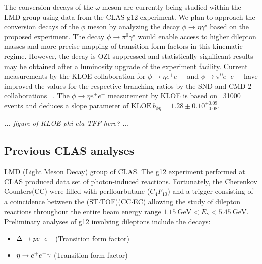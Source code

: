 The conversion decays of the  $\omega$ meson are currently being studied within the LMD group using data from the CLAS g12 experiment. 
We plan to approach the conversion decays of the $\phi$ meson by analyzing the decay $\phi\to\eta\gamma^\star$ based on the proposed experiment. 
The decay $\phi \to \pi^0\gamma^\star$ would enable access to higher dilepton masses and more precise mapping of transition form factors in this kinematic regime. However, the decay is OZI suppressed and statistically significant results may be obtained after a luminosity upgrade of the experiment facility.
Current measurements by the KLOE collaboration for $\phi\to\eta e^+e^-$~\cite{Babusci:2014ldz} and $\phi\to\pi^0 e^+e^-$~\cite{Anastasi:2016bfh} have improved the values for the respective branching ratios by the SND and CMD-2 collaborations ~\cite{Achasov:2000ne,Akhmetshin:2000bw,Achasov:2002hs,Akhmetshin:2000wi}. The $\phi\to\eta e^+e^-$ measurement by KLOE is based on ~31000 events and deduces a slope parameter of $ \text{KLOE} \ b_{\phi\eta}=1.28\pm 0.10^{+0.09}_{-0.08} $.

{\it ... figure of KLOE phi-eta TFF here? ...}

\subsection{Previous CLAS analyses}
LMD (Light Meson Decay) group of CLAS. 
The g12 experiment performed at CLAS produced data set of photon-induced reactions. Fortunately, the Cherenkov Counters(CC) were filled with perflourbutane ($C_4F_{10}$) and a trigger consisting of a coincidence between the (ST$\cdot$TOF)(CC$\cdot$EC) allowing the study of dilepton reactions throughout the entire beam energy range $1.15 \ \mathrm{GeV}<E_\gamma <5.45 \ \mathrm{GeV}$. Preliminary analyses of g12 involving dileptons include the decays:
\begin{itemize}
\item $\Delta \to p e^+e^-$ (Transition form factor)
\item $\eta \to e^+e^- \gamma$ (Transition form factor)
\end{itemize}

